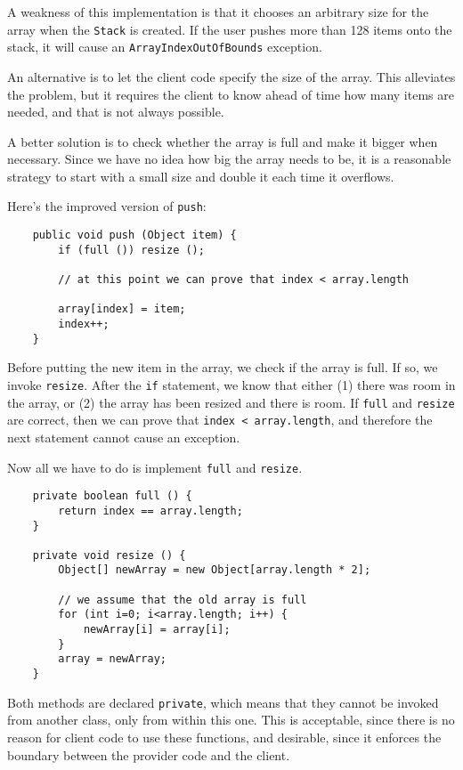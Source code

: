 A weakness of this implementation is that it chooses
an arbitrary size for the array when the {\tt Stack} is created.  If
the user pushes more than 128 items onto the stack, it will cause
an {\tt ArrayIndexOutOfBounds} exception.


An alternative is to let the client code specify the size of
the array.  This alleviates the problem, but it requires the client
to know ahead of time how many items are needed, and that is not
always possible.

A better solution is to check whether the array is full and make
it bigger when necessary.  Since we have no idea how big the
array needs to be, it is a reasonable strategy to start with a
small size and double it each time it overflows.

Here's the improved version of {\tt push}:

\begin{verbatim}
    public void push (Object item) {
        if (full ()) resize ();

        // at this point we can prove that index < array.length

        array[index] = item;
        index++;
    }
\end{verbatim}
%
Before putting the new item in the array, we check if the array
is full.  If so, we invoke {\tt resize}.  After the {\tt if} statement,
we know that either (1) there was room in the array, or (2) the
array has been resized and there is room.  If {\tt full} and
{\tt resize} are
correct, then we can prove that {\tt index < array.length}, and 
therefore the next statement cannot cause an exception.

Now all we have to do is implement {\tt full} and {\tt resize}.

\begin{verbatim}
    private boolean full () {
        return index == array.length;
    }

    private void resize () {
        Object[] newArray = new Object[array.length * 2];

        // we assume that the old array is full
        for (int i=0; i<array.length; i++) {
            newArray[i] = array[i];
        }
        array = newArray;
    }
\end{verbatim}
%
Both methods are declared {\tt private}, which means that they
cannot be invoked from another class, only from
within this one.  This is acceptable, since there is no reason
for client code to use these functions, and desirable, since
it enforces the boundary between the provider code and the
client.

